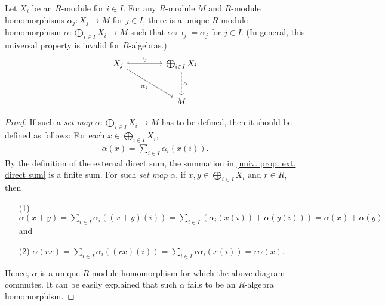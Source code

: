 \begin{prop}
    Let $X_i$ be an $R$-module for $i\in I$.
    For any $R$-module $M$ and $R$-module homomorphisms $\alpha_j: X_j\rightarrow M$ for $j\in I$, there is a unique $R$-module homomorphism $\alpha: \bigoplus_{i\in I} X_i\rightarrow M$ such that $\alpha\circ\imath_j=\alpha_j$ for $j\in I$.
    (In general, this universal property is invalid for $R$-algebras.)
    \begin{equation*}
    \begin{tikzcd}[row sep=1.0cm, column sep=1.5cm]
        X_j\arrow[r, "\imath_j", hook]\arrow[dr, "\alpha_j"']
        &
        \bigoplus_{i\in I} X_i\arrow[d, "\alpha", dashed]\\
        &
        M
    \end{tikzcd}
    \end{equation*}
\end{prop}
\begin{proof}
    If such a \textit{set map} $\alpha: \bigoplus_{i\in I} X_i\rightarrow M$ has to be defined, then it should be defined as follows: For each $x\in \bigoplus_{i\in I} X_i$,
    \begin{align}\label{univ. prop. ext. direct sum}
        \alpha(x)=\sum_{i\in I}\alpha_i(x(i)).
    \end{align}
    By the definition of the external direct sum, the summation in \cref{univ. prop. ext. direct sum} is a finite sum.
    For such \textit{set map} $\alpha$, if $x, y\in\bigoplus_{i\in I} X_i$ and $r\in R$, then
    \begin{enumerate}
        \item[(1)]
        {
            $\alpha(x+y)=\sum_{i\in I}\alpha_i((x+y)(i))=\sum_{i\in I}(\alpha_i(x(i))+\alpha(y(i)))=\alpha(x)+\alpha(y)$ and
        }
        \item[(2)]
        {
            $\alpha(rx)=\sum_{i\in I}\alpha_i((rx)(i))=\sum_{i\in I} r\alpha_i(x(i))=r\alpha(x)$.
        }
    \end{enumerate}
    Hence, $\alpha$ is a unique $R$-module homomorphism for which the above diagram commutes.
    It can be easily explained that such $\alpha$ fails to be an $R$-algebra homomorphism.
\end{proof}

